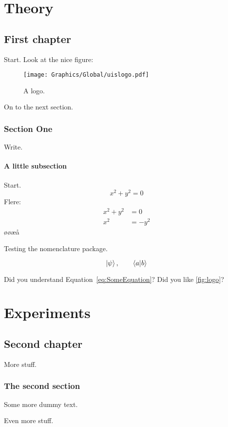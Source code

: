 \part{Theory}

\chapter{First chapter}
Start.
Look at the nice figure:


\begin{figure}[h]
	\centering
	\texttt{[image: Graphics/Global/uislogo.pdf]}
	\caption{A logo.}%
	\label{fig:logo}
\end{figure}

\noindent
On to the next section.

\newpage
\section{Section One}
Write.
  

\bigskip\noindent
\subsection{A little subsection}
Start.
\begin{equation}\label{eq:SomeEquation}
    x^2+y^2=0
\end{equation}
Flere:
\begin{align}
	x^2 + y^2 &= 0 \\
	x^2 &= -y^2
\end{align}
\o øæå\cite{test}

\medskip
Testing the nomenclature package.


\begin{equation*}
	\ket{\psi}, \qquad
	\braket{a}{b}
\end{equation*}

\noindent
Did you understand Equation~\eqref{eq:SomeEquation}?
Did you like \autoref{fig:logo}?






\part{Experiments}

\chapter{Second chapter}
More stuff.

\section{The second section}
Some more dummy text.


\medskip\noindent
Even more stuff.